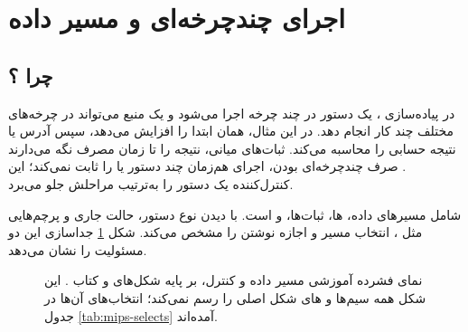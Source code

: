 \section{اجرای چندچرخه‌ای و مسیر داده}
\label{sec:mips-micro}
\subsection{چرا ؟}
در پیاده‌سازی ، یک دستور در چند چرخه اجرا می‌شود و یک منبع
می‌تواند در چرخه‌های مختلف چند کار انجام دهد. در این مثال، همان 
ابتدا  را افزایش می‌دهد، سپس آدرس یا نتیجه حسابی را محاسبه می‌کند.
ثبات‌های میانی، نتیجه را تا زمان مصرف نگه می‌دارند
\cite[بخش ]{weste}.
صرف چندچرخه‌ای بودن، اجرای هم‌زمان چند دستور یا  را ثابت نمی‌کند؛
این کنترل‌کننده یک دستور را به‌ترتیب مراحلش جلو می‌برد.

 شامل مسیرهای داده، ها، ثبات‌ها، 
و  است.  با دیدن نوع دستور، حالت جاری و پرچم‌هایی
مثل ، انتخاب مسیر و اجازه نوشتن را مشخص می‌کند.
شکل \ref{fig:mips-overview} جداسازی این دو مسئولیت را نشان می‌دهد.

\begin{figure}[ht]
\centering
\begin{latin}
\end{latin}
\caption{نمای فشرده آموزشی مسیر داده و کنترل، بر پایه شکل‌های 
و  کتاب \cite{weste}. این شکل همه سیم‌ها و های شکل اصلی را رسم نمی‌کند؛
انتخاب‌های آن‌ها در جدول \ref{tab:mips-selects} آمده‌اند.}
\label{fig:mips-overview}
\end{figure}

